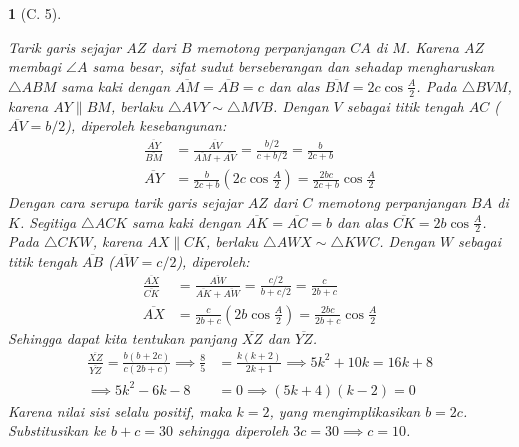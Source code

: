 \documentclass[11pt,a4paper,DIV=12]{scrartcl}
\theoremstyle{problemstyle}
\theoremstyle{answerstyle}
\newtheorem{answer}{}
\begin{document}
\begin{answer}[C. 5]
\begin{center}
  \end{center}
  Tarik garis sejajar $AZ$ dari $B$ memotong perpanjangan $CA$ di $M$. Karena $AZ$ membagi $\angle A$ sama besar, sifat sudut berseberangan dan sehadap mengharuskan $\triangle ABM$ sama kaki dengan ${\overline{AM}} = \overline{AB} = c$ dan alas $\overline{BM} = 2c \cos \frac{A}{2}$.
  Pada $\triangle BVM$, karena $AY \parallel BM$, berlaku $\triangle AVY \sim \triangle MVB$. Dengan $V$ sebagai titik tengah $AC$ ($\overline{AV}=b/2$), diperoleh kesebangunan:
  \begin{align*}
    \frac{\overline{AY}}{\overline{BM}} & = \frac{\overline{AV}}{\overline{AM} + \overline{AV}} = \frac{b/2}{c + b/2} = \frac{b}{2c+b} \\
    \overline{AY}                       & = \frac{b}{2c+b} \left( 2c \cos \frac{A}{2} \right) = \frac{2bc}{2c+b} \cos \frac{A}{2}
  \end{align*}
  Dengan cara serupa tarik garis sejajar $AZ$ dari $C$ memotong perpanjangan $BA$ di $K$. Segitiga $\triangle ACK$ sama kaki dengan $\overline{AK} = \overline{AC} = b$ dan alas $\overline{CK} = 2b \cos \frac{A}{2}$.
  Pada $\triangle CKW$, karena $AX \parallel CK$, berlaku $\triangle AWX \sim \triangle KWC$. Dengan $W$ sebagai titik tengah $\overline{AB}$ ($\overline{AW}=c/2$), diperoleh:
  \begin{align*}
    \frac{\overline{AX}}{\overline{CK}} & = \frac{\overline{AW}}{\overline{AK} + \overline{AW}} = \frac{c/2}{b + c/2} = \frac{c}{2b+c} \\
    \overline{AX}                       & = \frac{c}{2b+c} \left( 2b \cos \frac{A}{2} \right) = \frac{2bc}{2b+c} \cos \frac{A}{2}
  \end{align*}
  Sehingga dapat kita tentukan panjang $\overline{XZ}$ dan $\overline{YZ}$.
  \begin{align*}
    \frac{\overline{XZ}}{\overline{YZ}} = \frac{b(b+2c)}{c(2b+c)} \implies \frac{8}{5} & = \frac{k(k+2)}{2k+1}        \implies
    5k^2 + 10k                                                    = 16k + 8                                                    \\ \implies
    5k^2 - 6k - 8                                                                      & = 0 \implies (5k+4)(k-2) = 0
  \end{align*}
  Karena nilai sisi selalu positif, maka $k = 2$, yang mengimplikasikan $b = 2c$. Substitusikan ke $b+c=30$ sehingga diperoleh $3c=30 \implies c=10$.\\

\end{answer}
\end{document}
